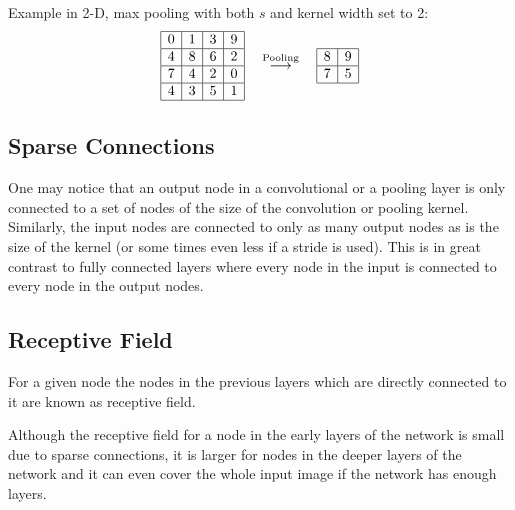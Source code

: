 \documentclass[]{article}
\begin{document}
Example in 2-D, max pooling with both $s$ and kernel width set to 2:
\[
\begin{array}{|c|c|c|c|}
  \hline
  0 & 1 & 3 & 9\\
  \hline
  4 & 8 & 6 & 2\\
  \hline
  7 & 4 & 2 & 0\\
  \hline
  4 & 3 & 5 & 1\\
  \hline
 \end{array}
 \quad \stackrel{\text{Pooling}}{\longrightarrow} \quad
 \begin{array}{|c|c|}
   \hline
   8 & 9\\
   \hline
   7 & 5\\
   \hline
  \end{array}
 \]

\subsection{Sparse Connections}
One may notice that an output node in a convolutional or a pooling layer is only
connected to a set of nodes of the size of the convolution or pooling kernel.
Similarly, the input nodes are connected to only as many output nodes as is the size
of the kernel (or some times even less if a stride is used). This is in great contrast
to fully connected layers where every node in the input is connected to every node
in the output nodes.


\subsection{Receptive Field}
For a given node the nodes in the previous layers which are directly connected
to it are known as receptive field.

Although the receptive field for a node in the early layers of the network is small
due to sparse connections, it is larger for nodes in the deeper layers of the network
and it can even cover the whole input image if the network has enough layers.
\end{document}
